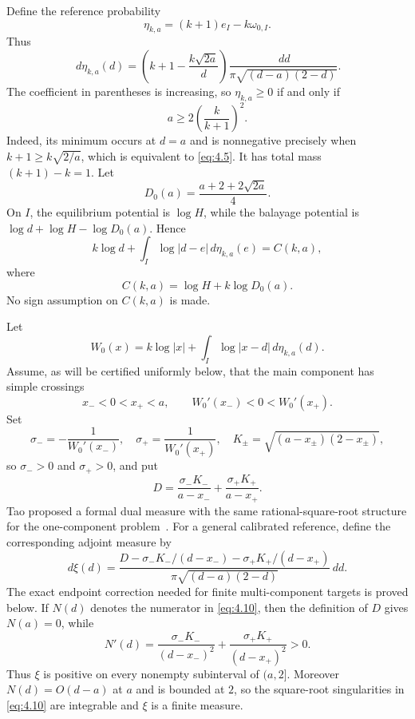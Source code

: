 \documentclass[11pt]{article}
\numberwithin{equation}{section}
\theoremstyle{plain}
\theoremstyle{definition}
\theoremstyle{remark}
\newcommand{\1}{\mathbf 1}
\newcommand{\dd}{\,d}
\begin{document}
Define the reference probability
\begin{equation}
 \eta_{k,a}=(k+1)e_I-k\omega_{0,I}.
\label{eq:4.3}
\end{equation}
Thus
\begin{equation}
 \dd\eta_{k,a}(d)=
 \left(k+1-\frac{k\sqrt{2a}}d\right)
 \frac{\dd d}{\pi\sqrt{(d-a)(2-d)}}.
\label{eq:4.4}
\end{equation}
The coefficient in parentheses is increasing, so $\eta_{k,a}\ge0$ if
and only if
\begin{equation}
 a\ge2\left(\frac{k}{k+1}\right)^2.
\label{eq:4.5}
\end{equation}
Indeed, its minimum occurs at $d=a$ and is nonnegative precisely when
$k+1\ge k\sqrt{2/a}$, which is equivalent to \eqref{eq:4.5}.  It has total mass
$(k+1)-k=1$.  Let
\[
 D_0(a)=\frac{a+2+2\sqrt{2a}}4.
\]
On $I$, the equilibrium potential is $\log H$, while the balayage
potential is $\log d+\log H-\log D_0(a)$.  Hence
\begin{equation}
 k\log d+\int_I\log|d-e|\dd\eta_{k,a}(e)=C(k,a),
\label{eq:4.6}
\end{equation}
where
\[
 C(k,a)=\log H+k\log D_0(a).
\]
No sign assumption on $C(k,a)$ is made.

Let
\[
 W_0(x)=k\log|x|+\int_I\log|x-d|\dd\eta_{k,a}(d).
\]
Assume, as will be certified uniformly below, that the main component has
simple crossings
\begin{equation}
 x_-<0<x_+<a,\qquad W_0'(x_-)<0<W_0'(x_+).
\label{eq:4.8}
\end{equation}
Set
\[
 \sigma_-=-\frac1{W_0'(x_-)},\quad
 \sigma_+=\frac1{W_0'(x_+)},\quad
 K_\pm=\sqrt{(a-x_\pm)(2-x_\pm)},
\]
so $\sigma_->0$ and $\sigma_+>0$, and put
\[
 D=\frac{\sigma_-K_-}{a-x_-}+\frac{\sigma_+K_+}{a-x_+}.
\]
Tao proposed a formal dual measure with the same rational-square-root
structure for the one-component problem~\cite[pp.~10--11]{Tao1038Updated}.
For a general calibrated reference, define the corresponding adjoint
measure by
\begin{equation}
 d\xi(d)=
 \frac{D-\sigma_-K_-/(d-x_-)-\sigma_+K_+/(d-x_+)}
 {\pi\sqrt{(d-a)(2-d)}}\dd d.
\label{eq:4.10}
\end{equation}
The exact endpoint correction needed for finite multi-component targets is
proved below.
If $N(d)$ denotes the numerator in \eqref{eq:4.10}, then the definition of $D$
gives $N(a)=0$, while
\[
 N'(d)=\frac{\sigma_-K_-}{(d-x_-)^2}
       +\frac{\sigma_+K_+}{(d-x_+)^2}>0.
\]
Thus $\xi$ is positive on every nonempty subinterval of $(a,2]$.
Moreover $N(d)=O(d-a)$ at $a$ and is bounded at $2$, so the square-root
singularities in \eqref{eq:4.10} are integrable and $\xi$ is a finite measure.
\end{document}
